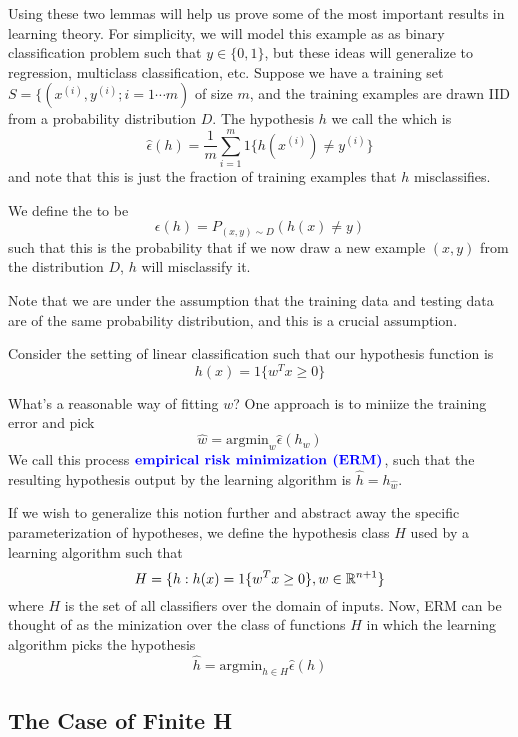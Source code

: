 \documentclass[12pt]{scrartcl}
\begin{document}
Using these two lemmas will help us prove some of the most important results in learning theory. For simplicity, we will model this example as as binary classification problem such that $y \in \{0, 1\}$, but these ideas will generalize to regression, multiclass classification, etc. Suppose we have a training set $S = \{(x^{(i)}, y^{(i)}; i = 1 \cdots m)$ of size $m$, and the training examples are drawn IID from a probability distribution $D$. The hypothesis $h$ we call the 
 which is 
\[\hat \epsilon(h) = \frac{1}{m}\sum_{i=1}^m 1 \{h(x^{(i)}) \neq y^{(i)}\}\]
and note that this is just the fraction of training examples that $h$ misclassifies.

We define the  to be 
\[\epsilon(h) = P_{(x,y) \sim D} (h(x) \neq y)\] such that this is the probability that if we now draw a new example $(x,y)$ from the distribution $D$, $h$ will misclassify it.

\begin{note}
    Note that we are under the assumption that the training data and testing data are of the same probability distribution, and this is a crucial assumption.
\end{note}

Consider the setting of linear classification such that our hypothesis function is 
\[h(x) = 1\{w^Tx \geq 0\}\]

\begin{definition}
What's a reasonable way of fitting $w$? One approach is to miniize the training error and pick
\[\hat w = \text{argmin}_{w}\hat\epsilon(h_w)\] 
We call this process $\textbf{\color{blue} empirical risk minimization (ERM)}$, such that the resulting hypothesis output by the learning algorithm is $\hat h = h_{\hat w}$.    
\end{definition}

If we wish to generalize this notion further and abstract away the specific parameterization of hypotheses, we define the hypothesis class $H$ used by a learning algorithm such that 
\[H = \{h: h(x) = 1 \{w^Tx\geq 0\}, w \in \mathbb R^{n+1}\}\]
where $H$ is the set of all classifiers over the domain of inputs. Now, ERM can be thought of as the minization over the class of functions $H$ in which the learning algorithm picks the hypothesis 
\[\hat h = \text{argmin}_{h \in H}\hat \epsilon(h)\]

\subsection{The Case of Finite H}
\end{document}
